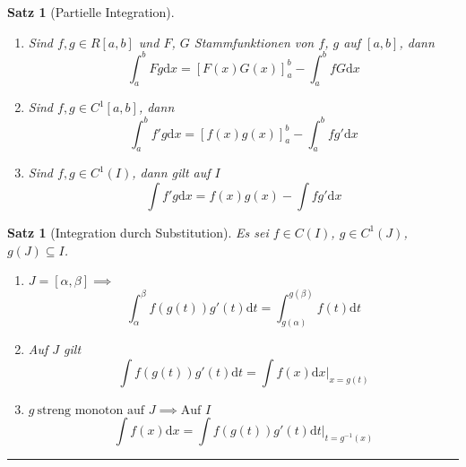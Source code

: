 \documentclass[a4paper]{article}
\newcounter{Sec}
\theoremstyle{marginbreak}
\newtheorem{satz}[definition]{Satz}
\newcommand{\sep}{%
	\rule{\textwidth}{0.3pt}%
	\stepcounter{Sec}%
	}
\renewcommand{\d}[1]{\mathrm{d}#1}
\begin{document}
	\begin{satz}[Partielle Integration]
		\begin{enumerate}[label=(\alph*)]
			\item Sind $f,g\in R[a,b]$ und $F$, $G$ Stammfunktionen von $f$, $g$
				auf $[a,b]$, dann
				\[ \int_a^bFg\d{x}=[F(x)G(x)]_a^b-\int_a^bfG\d{x} \]
			\item Sind $f,g\in C^1[a,b]$, dann
				\[ \int_a^bf'g\d{x}=[f(x)g(x)]_a^b-\int_a^bfg'\d{x} \]
			\item Sind $f,g\in C^1(I)$, dann gilt auf $I$
				\[ \int f'g\d{x}=f(x)g(x)-\int fg'\d{x} \]
		\end{enumerate}
	\end{satz}
	\begin{satz}[Integration durch Substitution]
		Es sei $f\in C(I)$, $g\in C^1(J)$, $g(J)\subseteq I$.
		\begin{enumerate}[label=(\alph*)]
			\item $J = [\alpha,\beta]\implies$
				\[ \int_\alpha^\beta f(g(t))g'(t)\d{t}=\int_{g(\alpha)}^{g(\beta)}f(t)\d{t} \]
			\item Auf $J$ gilt
				\[ \int f(g(t))g'(t)\d{t}=\int f(x)\d{x}|_{x=g(t)} \]
			\item $g~\text{streng monoton auf $J$}\implies\text{Auf $I$}$
				\[ \int f(x)\d{x}=\int f(g(t))g'(t)\d{t}|_{t=g^{-1}(x)} \]
		\end{enumerate}
	\end{satz}
	\newpage
	\sep
\end{document}
